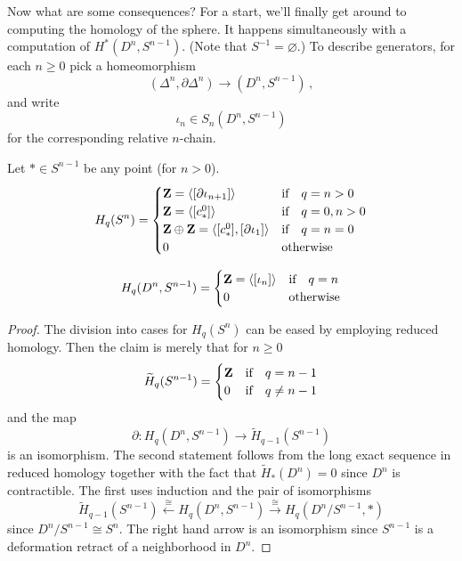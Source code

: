Now what are some consequences? For a start, we'll finally get around
to computing the homology of the sphere. 
It happens simultaneously with a computation of 
$ H^\ast(D^n,S^{n-1})$. (Note that $S^{-1}=\varnothing$.)
To describe generators, for each $n\geq0$ pick a homeomorphism
\[
(\Delta^n,\partial\Delta^n)\to(D^n,S^{n-1})\,,
\]
and write 
\[
\iota_n\in S_n(D^n,S^{n-1})
\]
for the corresponding relative $n$-chain.
\begin{prop} Let $\ast\in S^{n-1}$ be any point (for $n>0$). 
	 \begin{equation*}
	 H_q(S^n)=\begin{cases}
\mathbf Z = \langle[\partial\iota_{n+1}]\rangle & \hbox{if}\quad q=n>0 \\ 
\mathbf Z = \langle[c^0_\ast]\rangle & \hbox{if}\quad q=0,n>0\\ 
\mathbf Z\oplus\mathbf Z = \langle[c^0_\ast],[\partial\iota_1]\rangle & \hbox{if}\quad  q=n=0 \\
0 & \hbox{otherwise} \end{cases}
	\end{equation*}

	\item \begin{equation*}
	 H_q(D^n,S^{n-1}) = \begin{cases}
	\mathbf Z=\langle [\iota_n]\rangle & \hbox{if}\quad q=n\\
	0 & \hbox{otherwise}
	\end{cases}
	\end{equation*}
\end{prop}

\begin{proof}
The division into cases for $H_q(S^n)$ can be eased by employing reduced 
homology. Then the claim is merely that for $n\geq0$
\[
\widetilde H_q(S^{n-1})=
\begin{cases}\mathbf Z & \hbox{if}\quad q=n-1 \\ 
0 & \hbox{if}\quad q\neq n-1\end{cases}
\]
and the map 
\[
\partial:H_q(D^n,S^{n-1})\to \widetilde H_{q-1}(S^{n-1})
\]
is an isomorphism.  The second statement follows from the long exact sequence
in reduced homology together with the fact that $\widetilde H_*(D^n)=0$ 
since $D^n$ is contractible. The first uses induction and the pair of
isomorphisms
\[
\widetilde H_{q-1}(S^{n-1}) \xleftarrow{\cong}H_q(D^n,S^{n-1})
\xrightarrow{\cong}H_q(D^n/S^{n-1},\ast)
\]
since $D^n/S^{n-1}\cong S^n$. The right hand arrow is an isomorphism 
since $S^{n-1}$ is a deformation retract of a neighborhood in $D^n$.
\end{proof}

